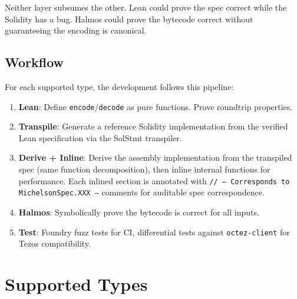 \documentclass[11pt,a4paper]{article}
\begin{document}
Neither layer subsumes the other. Lean could prove the spec correct while the
Solidity has a bug. Halmos could prove the bytecode correct without guaranteeing
the encoding is canonical.

\subsection{Workflow}

For each supported type, the development follows this pipeline:

\begin{enumerate}[label=\textbf{\arabic*.}]
  \item \textbf{Lean}: Define \texttt{encode}/\texttt{decode} as pure functions.
    Prove roundtrip properties.
  \item \textbf{Transpile}: Generate a reference Solidity implementation from the
    verified Lean specification via the SolStmt transpiler.
  \item \textbf{Derive + Inline}: Derive the assembly implementation from the
    transpiled spec (same function decomposition), then inline internal functions
    for performance. Each inlined section is annotated with
    \texttt{// -- Corresponds to MichelsonSpec.XXX --} comments for auditable
    spec correspondence.
  \item \textbf{Halmos}: Symbolically prove the bytecode is correct for all inputs.
  \item \textbf{Test}: Foundry fuzz tests for CI, differential tests against
    \texttt{octez-client} for Tezos compatibility.
\end{enumerate}

\section{Supported Types}
\end{document}
